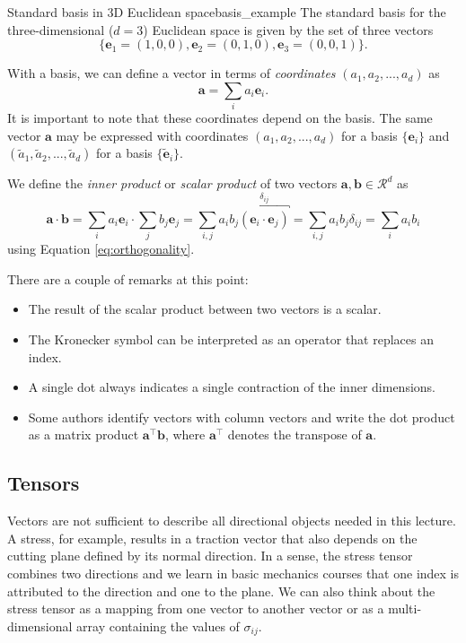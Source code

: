 \begin{example}{Standard basis in 3D Euclidean space}{basis_example}
    The standard basis for the three-dimensional ($d=3$) Euclidean space is given by the set of three vectors
    \begin{equation}
        \{\mathbf{e}_1=(1,0,0), \mathbf{e}_2=(0,1,0), \mathbf{e}_3=(0,0,1)\}.
    \end{equation}
\end{example}

With a basis, we can define a vector in terms of \emph{coordinates} $(a_1, a_2, ..., a_d)$ as 
\begin{equation}
    \label{eq:coordinates}
    \mathbf{a} = \sum_i a_i \mathbf{e}_i. 
\end{equation}
It is important to note that these coordinates depend on the basis. The same vector $\mathbf{a}$ may be expressed with coordinates $(a_1, a_2, ..., a_d)$ for a basis $\{\mathbf{e}_i\}$ and $(\tilde{a}_1, \tilde{a}_2, ..., \tilde{a}_d)$ for a basis $\{\tilde{\mathbf{e}}_i\}$. 

We define the \emph{inner product} or \emph{scalar product} of two vectors $\mathbf{a}, \mathbf{b} \in \mathcal{R}^d$ as 
\begin{equation}
    \mathbf{a} \cdot \mathbf{b} 
        = \sum_i a_i \mathbf{e}_i \cdot \sum_j b_j \mathbf{e}_j 
        =  \sum_{i,j} a_i b_j \overbracket{(\mathbf{e}_i \cdot \mathbf{e}_j)}^{\delta_{ij}} 
        = \sum_{i,j} a_i b_j \delta_{ij} = \sum_{i} a_i b_i
\end{equation}
using Equation \eqref{eq:orthogonality}.

There are a couple of remarks at this point:
\begin{itemize}
    \item The result of the scalar product between two vectors is a scalar.
    \item The Kronecker symbol can be interpreted as an operator that replaces an index.
    \item A single dot always indicates a single contraction of the inner dimensions.
    \item Some authors identify vectors with column vectors and write the dot product as a matrix product $\mathbf{a}^\top \mathbf{b}$, where $\mathbf{a}^\top$ denotes the transpose of $\mathbf{a}$.
\end{itemize}

\subsection{Tensors}
Vectors are not sufficient to describe all directional objects needed in this lecture. A stress, for example, results in a traction vector that also depends on the cutting plane defined by its normal direction. 
In a sense, the stress tensor combines two directions and we learn in basic mechanics courses that one index is attributed to the direction and one to the plane. We can also think about the stress tensor as a mapping from one vector to another vector or as a multi-dimensional array containing the values of $\sigma_{ij}$.

